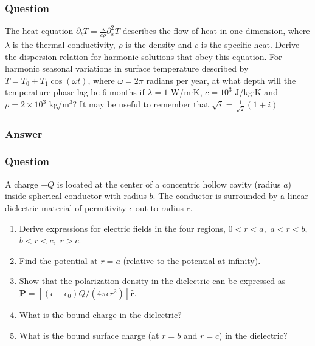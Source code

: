 \subsubsection{Question}

The heat equation $\partial_t T = \frac{\lambda}{c\rho}\partial^2_x T$ describes the flow of heat in one dimension, where $\lambda$ is the thermal conductivity, $\rho$ is the density and $c$ is the specific heat. Derive the dispersion relation for harmonic solutions that obey this equation. For harmonic seasonal variations in surface temperature described by $T = T_0 + T_1\cos(\omega t)$, where $\omega=2\pi$ radians per year, at what depth will the temperature phase lag be $6$ months if $\lambda=1$ W/m$\cdot$K, $c=10^3$ J/kg$\cdot$K and $\rho=2\times 10^3$ kg/m$^3$? It may be useful to remember that $\sqrt{i}=\frac{1}{\sqrt{2}}(1+i)$ 

\subsubsection{Answer}



\subsubsection{Question}

A charge $+Q$ is located at the center of a concentric hollow cavity (radius $a$) inside spherical conductor with radius $b$. The conductor is surrounded by a linear dielectric material of permitivity $\epsilon$ out to radius $c$.
\begin{enumerate}
	\item Derive expressions for electric fields in the four regions, $0<r<a,$ $a<r<b,$ $b<r<c,$ $r>c$.
	\item Find the potential at $r=a$ (relative to the potential at infinity).
	\item Show that the polarization density in the dielectric can be expressed as $\mathbf{P}=[(\epsilon-\epsilon_0)Q/(4\pi \epsilon r^2)]\hat{\mathbf{r}}$.
	\item What is the bound charge in the dielectric?
	\item What is the bound surface charge (at $r=b$ and $r=c$) in the dielectric? 
\end{enumerate}
